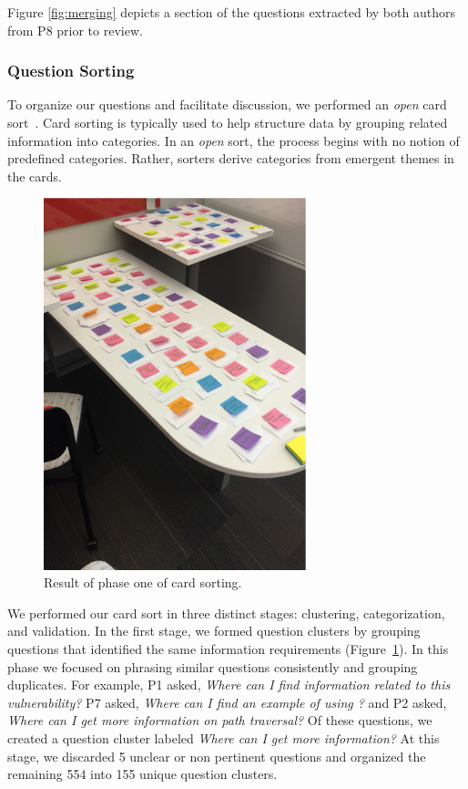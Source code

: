 \documentclass[conference]{IEEEtran}
\begin{document}
Figure \ref{fig:merging} depicts a section of the questions extracted by both authors from P8 prior to review.

\subsubsection{Question Sorting}
To organize our questions and facilitate discussion, we performed an \textit{open} card sort~\cite{hudson2013sorting}. 
Card sorting is typically used to help structure data by grouping related information into categories. 
In an \textit{open} sort, the process begins with no notion of predefined categories. 
Rather, sorters derive categories from emergent themes in the cards. 

\begin{figure}
\centering
\includegraphics[width=3in]{Images/notecards.pdf}
\caption{Result of phase one of card sorting.}
\label{fig:stageOne} 
\end{figure}

We performed our card sort in three distinct stages: clustering, categorization, and validation.
In the first stage, we formed question clusters by grouping questions that identified the same information requirements (Figure~\ref{fig:stageOne}). 
In this phase we focused on phrasing similar questions consistently and grouping duplicates.
For example, P1 asked, \textit{Where can I find information related to this vulnerability?} P7 asked, \textit{Where can I find an example of using ?} and P2 asked, \textit{Where can I get more information on path traversal?} 
Of these questions, we created a question cluster labeled \textit{Where can I get more information?}
At this stage, we discarded 5 unclear or non pertinent questions and organized the remaining 554 into 155 unique question clusters.
\end{document}
